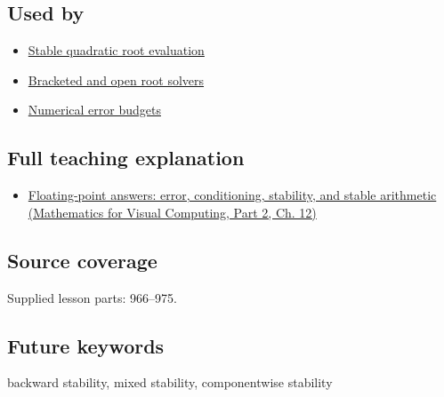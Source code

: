 \subsection{Used by}\label{appendix-aa2bf0d79639-used-by}

\hypertarget{appendix-aa2bf0d79639-used-by}{}

\begin{itemize}
\tightlist
\item
  \hyperref[appendix-b9afba7f63e5]{Stable quadratic root evaluation}
\item
  \hyperref[appendix-f63eb850796d]{Bracketed and open root solvers}
\item
  \hyperref[appendix-31b8c295e05f]{Numerical error budgets}
\end{itemize}

\subsection{Full teaching explanation}\label{appendix-aa2bf0d79639-full-teaching-explanation}

\hypertarget{appendix-aa2bf0d79639-full-teaching-explanation}{}

\begin{itemize}
\tightlist
\item
  \href{../02-Mathematics-for-Visual-Computing-P02/main.pdf\#nameddest=02-foundations-ii-ch028-floating-point-answers-error-conditioning-stability-and-stable-arithmetic}{Floating-point answers: error, conditioning, stability, and stable arithmetic (Mathematics for Visual Computing, Part 2, Ch. 12)}
\end{itemize}

\subsection{Source coverage}\label{appendix-aa2bf0d79639-source-coverage}

\hypertarget{appendix-aa2bf0d79639-source-coverage}{}

Supplied lesson parts: 966--975.

\subsection{Future keywords}\label{appendix-aa2bf0d79639-future-keywords}

\hypertarget{appendix-aa2bf0d79639-future-keywords}{}

backward stability, mixed stability, componentwise stability
